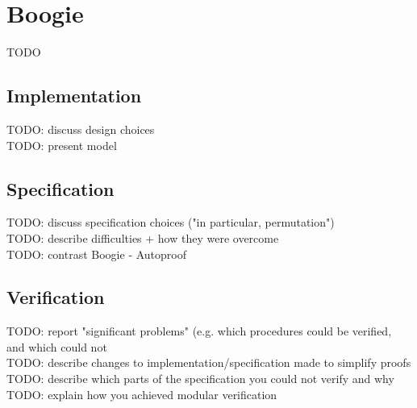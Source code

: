 \section{Boogie}\label{boogie_discussion}
TODO
\subsection{Implementation}
TODO: discuss design choices\\
TODO: present model

\subsection{Specification}
TODO: discuss specification choices ("in particular, permutation")\\
TODO: describe difficulties + how they were overcome\\
TODO: contrast Boogie - Autoproof

\subsection{Verification}
TODO: report "significant problems" (e.g. which procedures could be verified, and which could not\\
TODO: describe changes to implementation/specification made to simplify proofs\\
TODO: describe which parts of the specification you could not verify and why\\
TODO: explain how you achieved modular verification